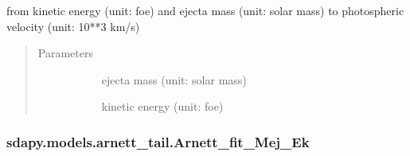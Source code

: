 \documentclass[letterpaper,10pt,english]{sphinxmanual}
\begin{document}
\begin{fulllineitems}
\label{\detokenize{generated/sdapy.models.arnett_tail.Mej_Ek_to_vej:sdapy.models.arnett_tail.Mej_Ek_to_vej}}
from kinetic energy (unit: foe) and ejecta mass (unit: solar mass) to photospheric velocity (unit: 10**3 km/s)
\begin{quote}\begin{description}
\item[{Parameters}] \leavevmode\begin{description}
\item[{}] \leavevmode{[}\sphinxtitleref{float}{]}
ejecta mass (unit: solar mass)

\item[{}] \leavevmode{[}\sphinxtitleref{float}{]}
kinetic energy (unit: foe)

\end{description}

\end{description}\end{quote}

\end{fulllineitems}



\subsubsection{sdapy.models.arnett\_tail.Arnett\_fit\_Mej\_Ek}
\label{\detokenize{generated/sdapy.models.arnett_tail.Arnett_fit_Mej_Ek:sdapy-models-arnett-tail-arnett-fit-mej-ek}}\label{\detokenize{generated/sdapy.models.arnett_tail.Arnett_fit_Mej_Ek::doc}}
\end{document}
